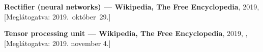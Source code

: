 \begin{thebibliography}{9}
	\textbf{Rectifier (neural networks) --- {Wikipedia}{,} The Free Encyclopedia},
	2019,
	[Meglátogatva: 2019.~október~29.]
	
	\textbf{Tensor processing unit --- {Wikipedia}{,} The Free Encyclopedia},
	2019,
	,
	[Meglátogatva: 2019. november 4.]

\end{thebibliography}